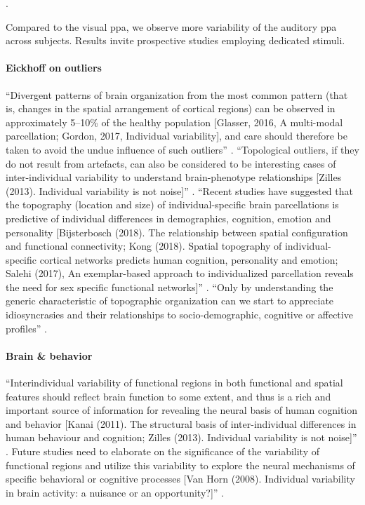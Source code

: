 .

%
Compared to the visual \ac{ppa}, we observe more variability of the auditory
\ac{ppa} across subjects.
%
Results invite prospective studies employing dedicated stimuli.


\paragraph{Eickhoff on outliers}
%
``Divergent patterns of brain organization from the most common pattern (that
is, changes in the spatial arrangement of cortical regions) can be observed in
approximately 5–10\% of the healthy population [Glasser, 2016, A multi-modal
parcellation; Gordon, 2017, Individual variability], and care should therefore
be taken to avoid the undue influence of such outliers''
\citep{eickhoff2018imaging}.
%
``Topological outliers, if they do not result from artefacts, can also be
considered to be interesting cases of inter-individual variability to understand
brain-phenotype relationships [Zilles (2013). Individual variability is not
noise]'' \citep{eickhoff2018imaging}.
%
``Recent studies have suggested that the topography (location and size) of
individual-specific brain parcellations is predictive of individual differences
in demographics, cognition, emotion and personality [Bijsterbosch (2018). The
relationship between spatial configuration and functional connectivity; Kong
(2018). Spatial topography of individual-specific cortical networks predicts
human cognition, personality and emotion; Salehi (2017), An exemplar-based
approach to individualized parcellation reveals the need for sex specific
functional networks]'' \citep{eickhoff2018imaging}.
%
``Only by understanding the generic characteristic of topographic organization
can we start to appreciate idiosyncrasies and their relationships to
socio-demographic, cognitive or affective profiles''
\citep{eickhoff2018imaging}.


\paragraph{Brain \& behavior}
%
``Interindividual variability of functional regions in both functional and
spatial features should reflect brain function to some extent, and thus is a
rich and important source of information for revealing the neural basis of human
cognition and behavior [Kanai (2011). The structural basis of inter-individual
differences in human behaviour and cognition; Zilles (2013). Individual
variability is not noise]'' \citep{zhen2015quantifying}.
%
Future studies need to elaborate on the significance of the variability of
functional regions and utilize this variability to explore the neural mechanisms
of specific behavioral or cognitive processes [Van Horn (2008). Individual
variability in brain activity: a nuisance or an opportunity?]''
\citep{zhen2015quantifying}.

